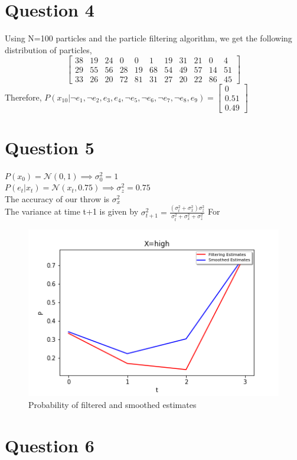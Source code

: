 \documentclass[letter, 10pt]{article}
\begin{document}
\section*{Question 4}Using N=100 particles and the particle filtering algorithm, we get the following distribution of particles,
\begin{equation*}
    \begin{bmatrix}
    38 & 19 & 24 & 0 & 0 & 1 & 19 & 31 & 21 & 0 & 4\\
    29 & 55 & 56 & 28 & 19 & 68 & 54 & 49 & 57 & 14 & 51\\
    33 & 26 & 20 & 72 & 81 & 31 & 27 & 20 & 22 & 86 & 45
    \end{bmatrix}
\end{equation*}
Therefore, $P(x_{10}|\neg e_1, \neg e_2, e_3, e_4, \neg e_5, \neg e_6, \neg e_7, \neg e_8, e_9) = \begin{bmatrix}0\\0.51\\0.49\end{bmatrix}$
\section*{Question 5}
$P(x_0) = \mathcal{N}(0,1) \implies \sigma_0^2=1$\\
$P(e_t|x_t) = \mathcal{N}(x_t,0.75) \implies \sigma_z^2=0.75$\\
The accuracy of our throw is $\sigma_x^2$\\
The variance at time t+1 is given by $\sigma_{t+1}^2 = \frac{(\sigma_t^2 + \sigma_x^2)\sigma_z^2}{\sigma_t^2 + \sigma_x^2 + \sigma_z^2}$
For 

\begin{figure}[H]
    \centering
        \includegraphics[width=\textwidth]{HW3/high.png}
    \caption{Probability of filtered and smoothed estimates}
\end{figure}

\section*{Question 6}
\end{document}
